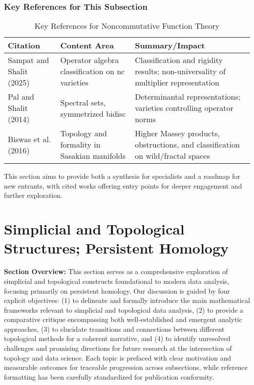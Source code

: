 \documentclass[sigconf]{acmart}
\begin{document}
\subsubsection*{Key References for This Subsection}
\begin{table*}[htbp]
\centering
\caption{Key References for Noncommutative Function Theory}
\label{tab:ncft_keyrefs}
\begin{adjustbox}{max width=\textwidth}
\begin{tabular}{@{}lll@{}}
\toprule
\textbf{Citation} & \textbf{Content Area} & \textbf{Summary/Impact} \\
\midrule
Sampat and Shalit (2025)~\cite{ref98} & Operator algebra classification on nc varieties & Classification and rigidity results; non-universality of multiplier representation \\
Pal and Shalit (2014)~\cite{ref99} & Spectral sets, symmetrized bidisc & Determinantal representations; varieties controlling operator norms \\
Biswas et al. (2016)~\cite{ref14} & Topology and formality in Sasakian manifolds & Higher Massey products, obstructions, and classification on wild/fractal spaces \\
\bottomrule
\end{tabular}
\end{adjustbox}
\end{table*}

This section aims to provide both a synthesis for specialists and a roadmap for new entrants, with cited works offering entry points for deeper engagement and further exploration.

\section{Simplicial and Topological Structures; Persistent Homology}

\noindent\textbf{Section Overview:} This section serves as a comprehensive exploration of simplicial and topological constructs foundational to modern data analysis, focusing primarily on persistent homology. Our discussion is guided by four explicit objectives: (1) to delineate and formally introduce the main mathematical frameworks relevant to simplicial and topological data analysis, (2) to provide a comparative critique encompassing both well-established and emergent analytic approaches, (3) to elucidate transitions and connections between different topological methods for a coherent narrative, and (4) to identify unresolved challenges and promising directions for future research at the intersection of topology and data science. Each topic is prefaced with clear motivation and measurable outcomes for traceable progression across subsections, while reference formatting has been carefully standardized for publication conformity. 
\end{document}
